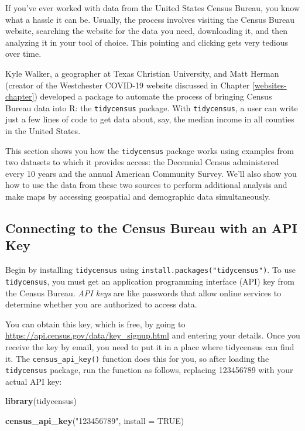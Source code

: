 \documentclass[
]{book}
\newenvironment{Shaded}{\begin{snugshade}}{\end{snugshade}}
\newcommand{\AttributeTok}[1]{\textcolor[rgb]{0.13,0.29,0.53}{#1}}
\newcommand{\ConstantTok}[1]{\textcolor[rgb]{0.56,0.35,0.01}{#1}}
\newcommand{\FunctionTok}[1]{\textcolor[rgb]{0.13,0.29,0.53}{\textbf{#1}}}
\newcommand{\NormalTok}[1]{#1}
\newcommand{\StringTok}[1]{\textcolor[rgb]{0.31,0.60,0.02}{#1}}
\begin{document}
If you've ever worked with data from the United States Census Bureau, you know what a hassle it can be. Usually, the process involves visiting the Census Bureau website, searching the website for the data you need, downloading it, and then analyzing it in your tool of choice. This pointing and clicking gets very tedious over time.

Kyle Walker, a geographer at Texas Christian University, and Matt Herman (creator of the Westchester COVID-19 website discussed in Chapter \ref{websites-chapter}) developed a package to automate the process of bringing Census Bureau data into R: the \texttt{tidycensus} package. With \texttt{tidycensus}, a user can write just a few lines of code to get data about, say, the median income in all counties in the United States.

This section shows you how the \texttt{tidycensus} package works using examples from two datasets to which it provides access: the Decennial Census administered every 10 years and the annual American Community Survey. We'll also show you how to use the data from these two sources to perform additional analysis and make maps by accessing geospatial and demographic data simultaneously.

\hypertarget{connecting-to-the-census-bureau-with-an-api-key}{%
\subsection*{Connecting to the Census Bureau with an API Key}\label{connecting-to-the-census-bureau-with-an-api-key}}

Begin by installing \texttt{tidycensus} using \texttt{install.packages("tidycensus")}. To use \texttt{tidycensus}, you must get an application programming interface (API) key from the Census Bureau. \emph{API keys} are like passwords that allow online services to determine whether you are authorized to access data.

You can obtain this key, which is free, by going to \url{https://api.census.gov/data/key_signup.html} and entering your details. Once you receive the key by email, you need to put it in a place where tidycensus can find it. The \texttt{census\_api\_key()} function does this for you, so after loading the \texttt{tidycensus} package, run the function as follows, replacing 123456789 with your actual API key:

\begin{Shaded}
\begin{Highlighting}[]
\FunctionTok{library}\NormalTok{(tidycensus)}

\FunctionTok{census\_api\_key}\NormalTok{(}\StringTok{"123456789"}\NormalTok{, }\AttributeTok{install =} \ConstantTok{TRUE}\NormalTok{)}
\end{Highlighting}
\end{Shaded}
\end{document}

